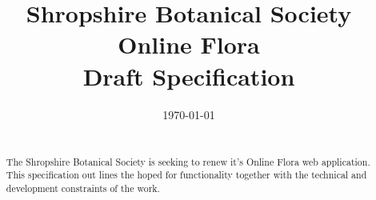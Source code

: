 \documentclass[a4paper,12pt,landscape]{article}
\title{Shropshire Botanical Society Online Flora\\
Draft Specification}
\author{\documentauthor}
\date{\today}
\begin{document}
\maketitle
\begin{abstract}
  \begin{center}
    \begin{minipage}{0.5\textwidth}
      \strut\\
      The Shropshire Botanical Society is seeking
      to renew it's Online Flora web application.
      This specification out lines the hoped for functionality
      together with the technical
      and
      development constraints of the work.
    \end{minipage}
  \end{center}
\end{abstract}

\newpage%
\mbox{}
\clearpage
\end{document}

